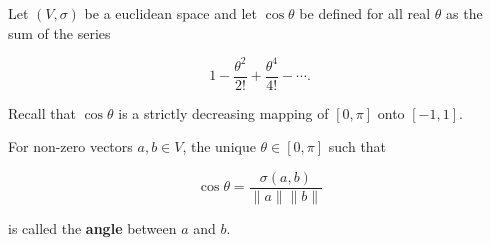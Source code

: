 Let $(V, \sigma)$ be a euclidean space and let $\cos \theta$ be defined for all real $\theta$ as the sum of the series

$$1 - \frac{\theta^2}{2!} + \frac{\theta^4}{4!} - \cdots.$$

Recall that $\cos \theta$ is a strictly decreasing mapping of $[0, \pi]$ onto $[-1, 1]$.

For non-zero vectors $a, b \in V$, the unique $\theta \in [0, \pi]$ such that

$$\cos \theta = \frac{\sigma(a, b)}{\|a\| \|b\|}$$

is called the \textbf{angle} between $a$ and $b$.
